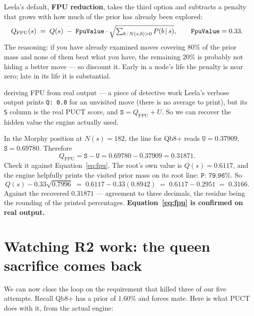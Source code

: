 Leela's default, \textbf{FPU reduction}, takes the third option and subtracts a penalty that
grows with how much of the prior has already been explored:
\begin{equation}
  \label{eq:fpu}
  Q_{\text{FPU}}(s) \;=\; Q(s) \;-\; \texttt{FpuValue}\cdot\sqrt{\textstyle\sum_{b \,:\, N(s,b)>0} P(b\,|\, s)},
  \qquad \texttt{FpuValue} = 0.33 .
\end{equation}
The reasoning: if you have already examined moves covering $80\%$ of the prior mass and none
of them beat what you have, the remaining $20\%$ is probably not hiding a better move ---
so discount it. Early in a node's life the penalty is near zero; late in its life it is
substantial.

\begin{worked}{deriving FPU from real output --- a piece of detective work}
Leela's verbose output prints \texttt{Q: 0.0} for an unvisited move (there is no average to
print), but its \texttt{S} column is the real PUCT score, and $\texttt{S} = Q_{\text{FPU}} +
U$. So we can recover the hidden value the engine actually used.

In the Morphy position at $N(s) = 182$, the line for Qb8+ reads
$\texttt{U} = 0.37909$, $\texttt{S} = 0.69780$. Therefore
\[
  Q_{\text{FPU}} = \texttt{S} - \texttt{U} = 0.69780 - 0.37909 = 0.31871 .
\]
Check it against Equation~\eqref{eq:fpu}. The root's own value is $Q(s) = 0.6117$, and the
engine helpfully prints the visited prior mass on its root line: $\texttt{P: 79.96\%}$. So
\[
  Q(s) - 0.33\sqrt{0.7996} \;=\; 0.6117 - 0.33(0.8942) \;=\; 0.6117 - 0.2951 \;=\; 0.3166 .
\]
Against the recovered $0.31871$ --- agreement to three decimals, the residue being the
rounding of the printed percentages. \textbf{Equation~\eqref{eq:fpu} is confirmed on real
output.}
\end{worked}

\section{Watching R2 work: the queen sacrifice comes back}

We can now close the loop on the requirement that killed three of our five attempts. Recall
Qb8+ has a prior of $1.60\%$ and forces mate. Here is what PUCT does with it, from the actual
engine:

